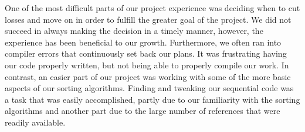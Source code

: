 \documentclass[11pt,twocolumn]{article}
\begin{document}
One of the most difficult parts of our project experience was deciding when to cut losses and move on in order to fulfill the greater goal of the project. We did not succeed in always making the decision in a timely manner, however, the experience has been beneficial to our growth. Furthermore, we often ran into compiler errors that continuously set back our plans. It was frustrating having our code properly written, but not being able to properly compile our work. In contrast, an easier part of our project was working with some of the more basic aspects of our sorting algorithms. Finding and tweaking our sequential code was a task that was easily accomplished, partly due to our familiarity with the sorting algorithms and another part due to the large number of references that were readily available.


\newpage
\printbibliography
\end{document}
